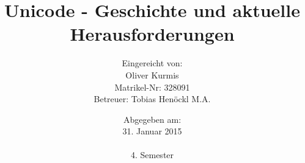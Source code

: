 
\begin{titlepage}
\titlehead{\large FOM Hochschule für Oekonomie \& Management Essen\\ 
Standort München\\
\normalsize Berufsbegleitender Studiengang zum B.Sc.\ Wirtschaftsinformatik}
\subject{\vspace{1cm}Seminararbeit}
\title{Unicode - Geschichte und aktuelle Herausforderungen}
\author{
 {\normalsize Eingereicht von:}
   \\Oliver Kurmis\\
  {\normalsize Matrikel-Nr: 328091}\\
  {\normalsize Betreuer: Tobias Henöckl M.A.}
}
\date{{\normalsize Abgegeben am:}\\31. Januar 2015\\\\4. Semester}


\end{titlepage}

\maketitle 

\thispagestyle{empty}
